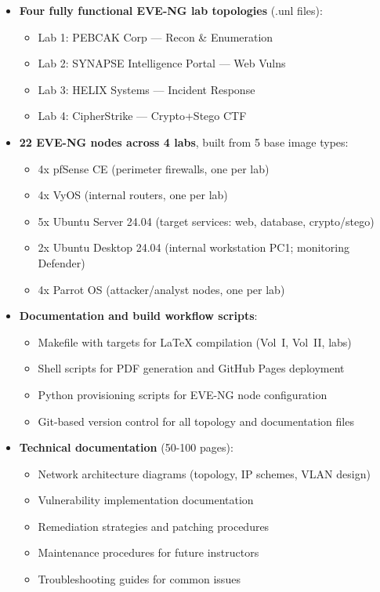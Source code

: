 \begin{itemize}
    \item \textbf{Four fully functional EVE-NG lab topologies} (.unl files):
    \begin{itemize}
        \item Lab 1: PEBCAK Corp — Recon & Enumeration
        \item Lab 2: SYNAPSE Intelligence Portal — Web Vulns
        \item Lab 3: HELIX Systems — Incident Response
        \item Lab 4: CipherStrike — Crypto+Stego CTF
    \end{itemize}
    \item \textbf{22 EVE-NG nodes across 4 labs}, built from 5 base image types:
    \begin{itemize}
        \item 4x pfSense CE (perimeter firewalls, one per lab)
        \item 4x VyOS (internal routers, one per lab)
        \item 5x Ubuntu Server 24.04 (target services: web, database, crypto/stego)
        \item 2x Ubuntu Desktop 24.04 (internal workstation PC1; monitoring Defender)
        \item 4x Parrot OS (attacker/analyst nodes, one per lab)
    \end{itemize}
    \item \textbf{Documentation and build workflow scripts}:
    \begin{itemize}
        \item Makefile with targets for LaTeX compilation (Vol~I, Vol~II, labs)
        \item Shell scripts for PDF generation and GitHub Pages deployment
        \item Python provisioning scripts for EVE-NG node configuration
        \item Git-based version control for all topology and documentation files
    \end{itemize}
    
    \item \textbf{Technical documentation} (50-100 pages):
    \begin{itemize}
        \item Network architecture diagrams (topology, IP schemes, VLAN design)
        \item Vulnerability implementation documentation
        \item Remediation strategies and patching procedures
        \item Maintenance procedures for future instructors
        \item Troubleshooting guides for common issues
    \end{itemize}
    

\end{itemize}

